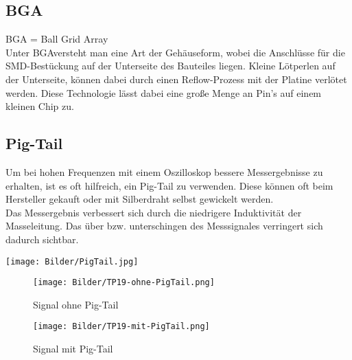 \newpage
\subsection{BGA}
BGA = Ball Grid Array
\\
Unter \glqq BGA\grqq versteht man eine Art der Gehäuseform, wobei die Anschlüsse für die SMD-Bestückung auf der Unterseite des Bauteiles liegen. Kleine Lötperlen auf der Unterseite, können dabei durch einen Reflow-Prozess mit der Platine verlötet werden. Diese Technologie lässt dabei eine große Menge an Pin's auf einem kleinen Chip zu. 


\subsection{Pig-Tail}
Um bei hohen Frequenzen mit einem Oszilloskop bessere Messergebnisse zu erhalten, ist es oft hilfreich, ein Pig-Tail zu verwenden. Diese können oft beim Hersteller gekauft oder mit Silberdraht selbst gewickelt werden. 
\\
Das Messergebnis verbessert sich durch die niedrigere Induktivität der Masseleitung. Das über bzw. unterschingen des Messsignales verringert sich dadurch sichtbar. 


\begin{center}

\texttt{[image: Bilder/PigTail.jpg]}


\end{center}


\begin{figure}[htb]
    \centering
    \begin{minipage}[t]{0.45\linewidth}
        \centering
        \texttt{[image: Bilder/TP19-ohne-PigTail.png]}
        \caption{Signal ohne Pig-Tail}
    \end{minipage}%
    \hfill
    \begin{minipage}[t]{0.45\linewidth}
        \centering
        \texttt{[image: Bilder/TP19-mit-PigTail.png]}
        \caption{Signal mit Pig-Tail}
    \end{minipage}
\end{figure}
